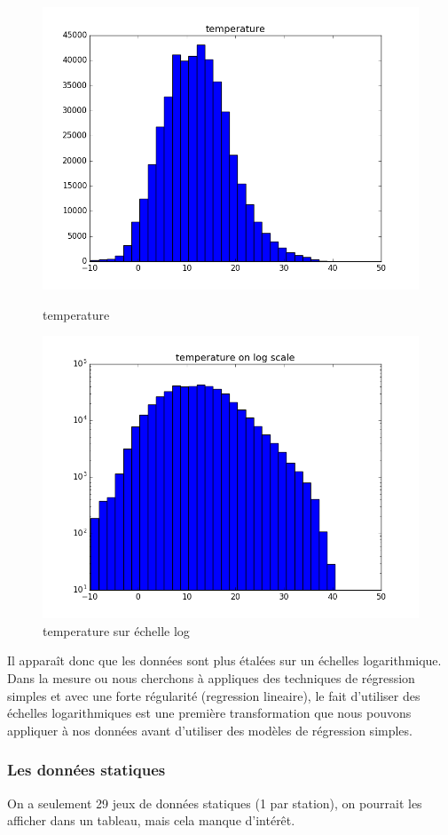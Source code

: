 \begin{figure}[H]
\captionsetup{labelformat=empty}
  \includegraphics[width=\linewidth]{images/temperature.png}
  \caption{temperature}
\endminipage\hfill
{}
  \includegraphics[width=\linewidth]{images/log_temperature.png}
  \caption{temperature sur échelle log}
\endminipage\hfill
\end{figure}

Il apparaît donc que les données sont plus étalées sur un échelles logarithmique.
Dans la mesure ou nous cherchons à appliques des techniques de régression simples et avec une forte régularité (regression lineaire), le fait d'utiliser des échelles logarithmiques est une première transformation que nous pouvons appliquer à nos données avant d'utiliser des modèles de régression simples.

\subsubsection{Les données statiques}

On a seulement 29 jeux de données statiques (1 par station), on pourrait les afficher dans un tableau, mais cela manque d'intérêt.
